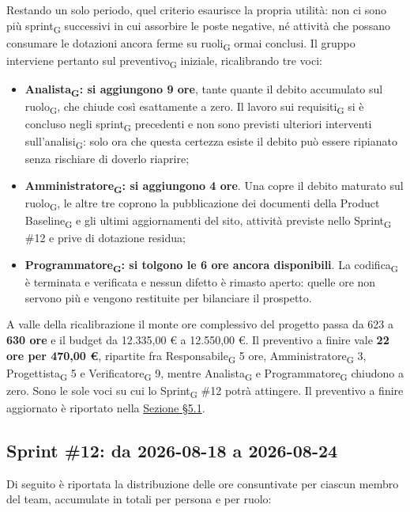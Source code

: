﻿\documentclass[a4paper, 10pt, colorlinks=true, linkcolor=black, urlcolor=blue, citecolor=blue, hidelinks]{article}
\begin{document}
Restando un solo periodo, quel criterio esaurisce la propria utilità: non ci sono più sprint\textsubscript{G} successivi in cui assorbire le poste negative, né attività che possano consumare le dotazioni ancora ferme su ruoli\textsubscript{G} ormai conclusi. Il gruppo interviene pertanto sul preventivo\textsubscript{G} iniziale, ricalibrando tre voci:
\begin{itemize}
    \item \textbf{Analista\textsubscript{G}: si aggiungono 9 ore}, tante quante il debito accumulato sul ruolo\textsubscript{G}, che chiude così esattamente a zero. Il lavoro sui requisiti\textsubscript{G} si è concluso negli sprint\textsubscript{G} precedenti e non sono previsti ulteriori interventi sull'analisi\textsubscript{G}: solo ora che questa certezza esiste il debito può essere ripianato senza rischiare di doverlo riaprire;

    \item \textbf{Amministratore\textsubscript{G}: si aggiungono 4 ore}. Una copre il debito maturato sul ruolo\textsubscript{G}, le altre tre coprono la pubblicazione dei documenti della Product Baseline\textsubscript{G} e gli ultimi aggiornamenti del sito, attività previste nello Sprint\textsubscript{G} \#12 e prive di dotazione residua;

    \item \textbf{Programmatore\textsubscript{G}: si tolgono le 6 ore ancora disponibili}. La codifica\textsubscript{G} è terminata e verificata e nessun difetto è rimasto aperto: quelle ore non servono più e vengono restituite per bilanciare il prospetto.
\end{itemize}

A valle della ricalibrazione il monte ore complessivo del progetto passa da 623 a \textbf{630 ore} e il budget da 12.335,00 € a 12.550,00 €. Il preventivo a finire vale \textbf{22 ore per 470,00 €}, ripartite fra Responsabile\textsubscript{G} 5 ore, Amministratore\textsubscript{G} 3, Progettista\textsubscript{G} 5 e Verificatore\textsubscript{G} 9, mentre Analista\textsubscript{G} e Programmatore\textsubscript{G} chiudono a zero. Sono le sole voci su cui lo Sprint\textsubscript{G} \#12 potrà attingere. Il preventivo a finire aggiornato è riportato nella \hyperref[tab:preventivo-finire]{Sezione \S5.1}.

\subsection{Sprint \#12: da 2026-08-18 a 2026-08-24}
Di seguito è riportata la distribuzione delle ore consuntivate per ciascun membro del team, accumulate in totali per persona e per ruolo:
\end{document}
